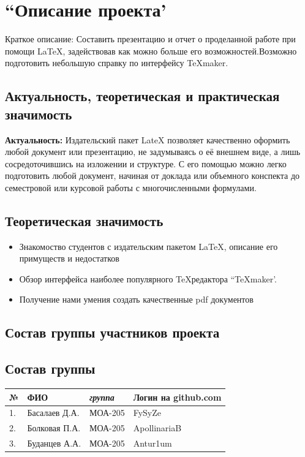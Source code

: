 \documentclass[14pt, a4paper]{extarticle}
\begin{document}
\newpage%
\tableofcontents


\newpage%
\section{``Описание проекта'}
Краткое описание: Составить презентацию и отчет о проделанной работе при помощи \LaTeX, задействовав как можно больше его возможностей.Возможно подготовить небольшую справку по интерфейсу \TeX maker.
\subsection{Актуальность, теоретическая и практическая значимость}
\textbf{Актуальность:}
Издательский пакет LateX позволяет качественно оформить любой документ или презентацию, не задумываясь о её внешнем виде, а лишь сосредоточившись на изложении и структуре. С его помощью можно легко подготовить любой документ, начиная от доклада или объемного конспекта до семестровой или курсовой работы с многочисленными формулами.
\subsection{Теоретическая значимость}
\begin{itemize}
  \item Знакомоство студентов с издательским пакетом \LaTeX, описание его примуществ и недостатков
  \item Обзор интерфейса наиболее популярного \TeX редактора ``\TeX maker'.
 \item Получение нами умения создать качественные pdf документов 
\end{itemize} 
\subsection{Состав группы участников проекта}
\subsection{Состав группы}
\begin{tabular}{| l| l| l| l|}
\hline {\bfseries \large №} & {\bfseries \large ФИО} & {\bfseries \large \textsl{группа}} & {\bfseries \large Логин на github.com } \\ \hline
1. & Басалаев Д.А.  & МОА-205 & FySyZe \\ \hline
2. & Болковая П.А.  & МОА-205 & ApollinariaB \\ \hline
3. & Буданцев А.А.  & МОА-205 & Antur1um \\ \hline
\end{tabular}
\end{document}
